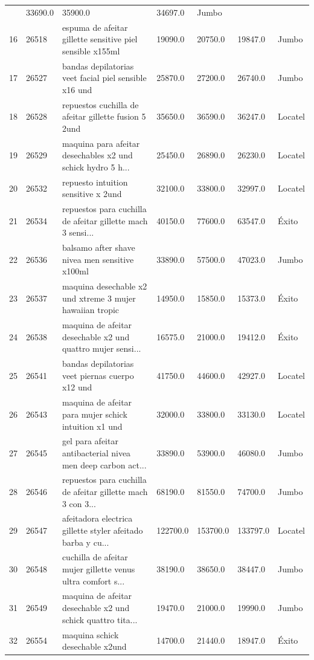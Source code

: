 \documentclass[
  spanish,
  letterpaper,
  DIV=11,
  numbers=noendperiod]{scrartcl}
\begin{document}
{\begin{longtable}[]{@{}lllllll@{}}
& 33690.0 & 35900.0 & 34697.0 & Jumbo \\
16 & 26518 & espuma de afeitar gillette sensitive piel sensible x155ml &
19090.0 & 20750.0 & 19847.0 & Jumbo \\
17 & 26527 & bandas depilatorias veet facial piel sensible x16 und &
25870.0 & 27200.0 & 26740.0 & Jumbo \\
18 & 26528 & repuestos cuchilla de afeitar gillette fusion 5 2und &
35650.0 & 36590.0 & 36247.0 & Locatel \\
19 & 26529 & maquina para afeitar desechables x2 und schick hydro 5 h...
& 25450.0 & 26890.0 & 26230.0 & Locatel \\
20 & 26532 & repuesto intuition sensitive x 2und & 32100.0 & 33800.0 &
32997.0 & Locatel \\
21 & 26534 & repuestos para cuchilla de afeitar gillette mach 3 sensi...
& 40150.0 & 77600.0 & 63547.0 & Éxito \\
22 & 26536 & balsamo after shave nivea men sensitive x100ml & 33890.0 &
57500.0 & 47023.0 & Jumbo \\
23 & 26537 & maquina desechable x2 und xtreme 3 mujer hawaiian tropic &
14950.0 & 15850.0 & 15373.0 & Éxito \\
24 & 26538 & maquina de afeitar desechable x2 und quattro mujer sensi...
& 16575.0 & 21000.0 & 19412.0 & Éxito \\
25 & 26541 & bandas depilatorias veet piernas cuerpo x12 und & 41750.0 &
44600.0 & 42927.0 & Locatel \\
26 & 26543 & maquina de afeitar para mujer schick intuition x1 und &
32000.0 & 33800.0 & 33130.0 & Locatel \\
27 & 26545 & gel para afeitar antibacterial nivea men deep carbon act...
& 33890.0 & 53900.0 & 46080.0 & Jumbo \\
28 & 26546 & repuestos para cuchilla de afeitar gillette mach 3 con 3...
& 68190.0 & 81550.0 & 74700.0 & Jumbo \\
29 & 26547 & afeitadora electrica gillette styler afeitado barba y cu...
& 122700.0 & 153700.0 & 133797.0 & Locatel \\
30 & 26548 & cuchilla de afeitar mujer gillette venus ultra comfort s...
& 38190.0 & 38650.0 & 38447.0 & Jumbo \\
31 & 26549 & maquina de afeitar desechable x2 und schick quattro tita...
& 19470.0 & 21000.0 & 19990.0 & Jumbo \\
32 & 26554 & maquina schick desechable x2und & 14700.0 & 21440.0 &
18947.0 & Éxito \\

\end{longtable}}
\end{document}
